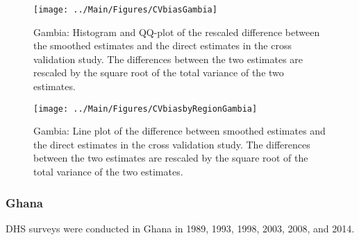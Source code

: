 \documentclass[12pt]{article}\usepackage[]{graphicx}\usepackage[]{color}
\newenvironment{knitrout}{}{} %
\begin{document}
\begin{knitrout}
\color{fgcolor}\begin{figure}[bht]

{\centering \texttt{[image: ../Main/Figures/CVbiasGambia]} 

}

\caption[Gambia]{Gambia: Histogram and QQ-plot of the rescaled difference between the smoothed estimates and the direct estimates in the cross validation study. The differences between the two estimates are rescaled by the square root of the total variance of the two estimates.}\label{fig:unnamed-chunk-139}
\end{figure}


\end{knitrout}

\begin{knitrout}
\color{fgcolor}\begin{figure}[bht]

{\centering \texttt{[image: ../Main/Figures/CVbiasbyRegionGambia]} 

}

\caption[Gambia]{Gambia: Line plot of the difference between smoothed estimates and the direct estimates in the cross validation study. The differences between the two estimates are rescaled by the square root of the total variance of the two estimates.}\label{fig:unnamed-chunk-140}
\end{figure}


\end{knitrout}


\clearpage
\subsubsection{Ghana}





DHS surveys were conducted in Ghana in 1989, 1993, 1998, 2003, 2008, and 2014.
\end{document}
